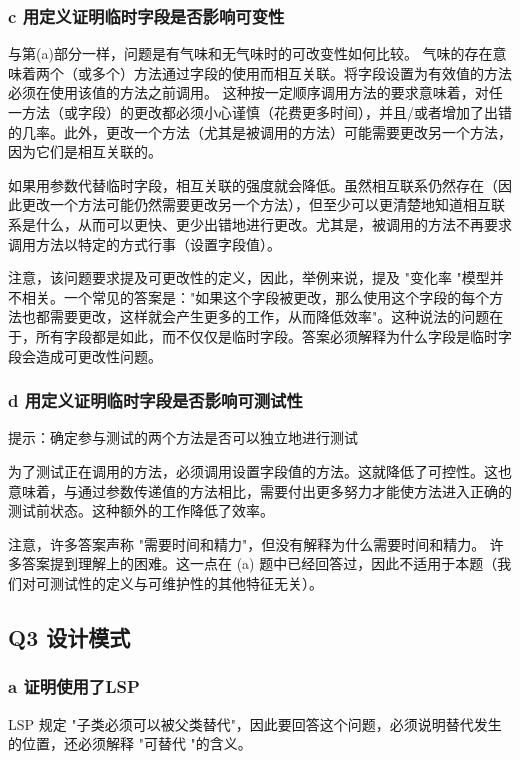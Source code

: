 \subsubsection{c 用定义证明临时字段是否影响可变性}

与第(a)部分一样，问题是有气味和无气味时的可改变性如何比较。
气味的存在意味着两个（或多个）方法通过字段的使用而相互关联。将字段设置为有效值的方法必须在使用该值的方法之前调用。
这种按一定顺序调用方法的要求意味着，对任一方法（或字段）的更改都必须小心谨慎（花费更多时间），并且/或者增加了出错的几率。此外，更改一个方法（尤其是被调用的方法）可能需要更改另一个方法，因为它们是相互关联的。

如果用参数代替临时字段，相互关联的强度就会降低。虽然相互联系仍然存在（因此更改一个方法可能仍然需要更改另一个方法），但至少可以更清楚地知道相互联系是什么，从而可以更快、更少出错地进行更改。尤其是，被调用的方法不再要求调用方法以特定的方式行事（设置字段值）。

注意，该问题要求提及可更改性的定义，因此，举例来说，提及 "变化率 "模型并不相关。一个常见的答案是："如果这个字段被更改，那么使用这个字段的每个方法也都需要更改，这样就会产生更多的工作，从而降低效率"。这种说法的问题在于，所有字段都是如此，而不仅仅是临时字段。答案必须解释为什么字段是临时字段会造成可更改性问题。

\subsubsection{d 用定义证明临时字段是否影响可测试性}

提示：确定参与测试的两个方法是否可以独立地进行测试

为了测试正在调用的方法，必须调用设置字段值的方法。这就降低了可控性。这也意味着，与通过参数传递值的方法相比，需要付出更多努力才能使方法进入正确的测试前状态。这种额外的工作降低了效率。

注意，许多答案声称 "需要时间和精力"，但没有解释为什么需要时间和精力。
许多答案提到理解上的困难。这一点在 (a) 题中已经回答过，因此不适用于本题（我们对可测试性的定义与可维护性的其他特征无关）。

\subsection{Q3 设计模式}

\subsubsection{a 证明使用了LSP}

LSP 规定 "子类必须可以被父类替代"，因此要回答这个问题，必须说明替代发生的位置，还必须解释 "可替代 "的含义。

